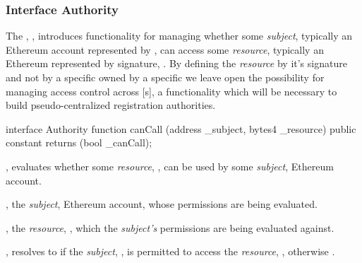 \subsubsection{Interface Authority}

The , , introduces functionality for
managing whether some \emph{subject}, typically an Ethereum account represented
by , can access some \emph{resource}, typically an Ethereum
 represented by  signature, . By
defining the \emph{resource} by it's  signature and not by a
specific  owned by a specific  we leave open the
possibility for managing  access control across
[s], a functionality which will be necessary to build
pseudo-centralized registration authorities.

\begin{solidity}
interface Authority {
  function canCall (address _subject, bytes4 _resource) public constant returns (bool _canCall);
}
\end{solidity}

\begin{interface}
  \item \specification{}

  \begin{functions}
    \item {}, evaluates
      whether some \emph{resource}, , can be used by
      some \emph{subject}, Ethereum account.

      \begin{parameters}
        \item {}, the \emph{subject}, Ethereum account,
          whose permissions are being evaluated.\footnotemark{}


        \item {}, the \emph{resource}, , which the \emph{subject's} permissions are being evaluated
          against.
      \end{parameters}

      \begin{returns}
        \item {}, resolves to  if the
          \emph{subject}, , is permitted to access the
          \emph{resource}, , otherwise .
      \end{returns}
  \end{functions}
\end{interface}
